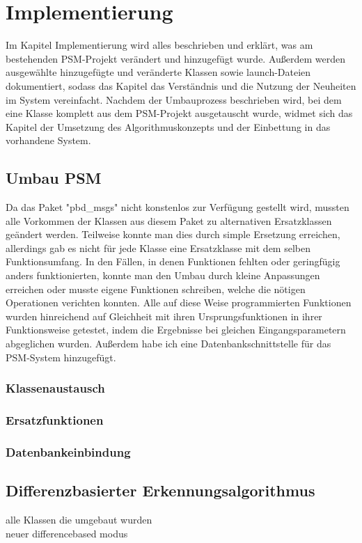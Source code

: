 \chapter{Implementierung}\label{ch:implementierung}

Im Kapitel Implementierung wird alles beschrieben und erklärt, was am bestehenden PSM-Projekt verändert und hinzugefügt wurde. Außerdem werden ausgewählte hinzugefügte und veränderte Klassen sowie launch-Dateien dokumentiert, sodass das Kapitel das Verständnis und die Nutzung der Neuheiten im System vereinfacht. Nachdem der Umbauprozess beschrieben wird, bei dem eine Klasse komplett aus dem PSM-Projekt ausgetauscht wurde, widmet sich das Kapitel der Umsetzung des Algorithmuskonzepts und der Einbettung in das vorhandene System.

\section{Umbau PSM}
Da das Paket "pbd\_msgs" nicht konstenlos zur Verfügung gestellt wird, mussten alle Vorkommen der Klassen aus diesem Paket zu alternativen Ersatzklassen geändert werden. Teilweise konnte man dies durch simple Ersetzung erreichen, allerdings gab es nicht für jede Klasse eine Ersatzklasse mit dem selben Funktionsumfang. In den Fällen, in denen Funktionen fehlten oder geringfügig anders funktionierten, konnte man den Umbau durch kleine Anpassungen erreichen oder musste eigene Funktionen schreiben, welche die nötigen Operationen verichten konnten. Alle auf diese Weise programmierten Funktionen wurden hinreichend auf Gleichheit mit ihren Ursprungsfunktionen in ihrer Funktionsweise getestet, indem die Ergebnisse bei gleichen Eingangsparametern abgeglichen wurden. Außerdem habe ich eine Datenbankschnittstelle für das PSM-System hinzugefügt.
\subsection{Klassenaustausch}

\subsection{Ersatzfunktionen}

\subsection{Datenbankeinbindung}


\section{Differenzbasierter Erkennungsalgorithmus}

alle Klassen die umgebaut wurden\\
neuer differencebased modus \\



\begin{deprecated}
\cite{davis93}


\end{deprecated}
